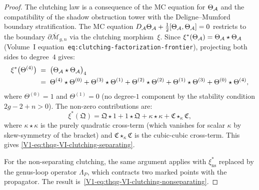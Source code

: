 \begin{proof}
The clutching law is a consequence of the MC equation for
$\Theta_{\mathcal{A}}$ and the compatibility of the shadow obstruction tower
with the Deligne--Mumford boundary stratification. The MC equation
$D_{\mathcal{A}}\Theta_{\mathcal{A}} + \tfrac{1}{2}[\Theta_{\mathcal{A}},\Theta_{\mathcal{A}}] = 0$
restricts to the boundary $\partial\overline{\mathcal{M}}_{g,n}$
via the clutching morphism~$\xi$. Since
$\xi^*(\Theta_{\mathcal{A}}) = \Theta_{\mathcal{A}} \star \Theta_{\mathcal{A}}$
(Volume~I equation~\texttt{eq:clutching-factorization-frontier}), projecting
both sides to degree~$4$ gives:
\begin{align*}
\xi^*\bigl(\Theta^{(4)}\bigr)
&\;=\;
\bigl(\Theta_{\mathcal{A}} \star \Theta_{\mathcal{A}}\bigr)_4 \\
&\;=\;
\Theta^{(4)} \star \Theta^{(0)}
+ \Theta^{(3)} \star \Theta^{(1)}
+ \Theta^{(2)} \star \Theta^{(2)}
+ \Theta^{(1)} \star \Theta^{(3)}
+ \Theta^{(0)} \star \Theta^{(4)},
\end{align*}
where $\Theta^{(0)} = 1$ and $\Theta^{(1)} = 0$ (no degree-$1$
component by the stability condition $2g - 2 + n > 0$).
The non-zero contributions are:
\[
\xi^*(\mathfrak{Q})
= \mathfrak{Q} \star 1 + 1 \star \mathfrak{Q}
 + \kappa \star \kappa
 + \mathfrak{C} \star_\kappa \mathfrak{C},
\]
where $\kappa \star \kappa$ is the purely quadratic
cross-term (which vanishes for scalar $\kappa$ by
skew-symmetry of the bracket) and
$\mathfrak{C} \star_\kappa \mathfrak{C}$ is the
cubic-cubic cross-term. This gives
\eqref{V1-eq:thqg-VI-clutching-separating}.

For the non-separating clutching, the same argument applies with
$\xi_{\mathrm{ns}}^*$ replaced by the genus-loop operator
$\Lambda_P$, which contracts two marked points with the
propagator. The result is~\eqref{V1-eq:thqg-VI-clutching-nonseparating}.
\end{proof}

